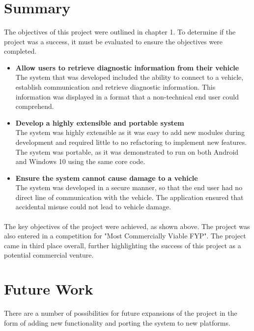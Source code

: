 \section{Summary}
	\paragraph{}{
	The objectives of this project were outlined in chapter 1. To determine if the project was a success, it must be evaluated to ensure the objectives were completed. 
		\begin{itemize}
			\item \textbf{Allow users to retrieve diagnostic information from their vehicle}\\
			The system that was developed included the ability to connect to a vehicle, establish communication and retrieve diagnostic information. This information was displayed in a format that a non-technical end user could comprehend.
			
			\item \textbf{Develop a highly extensible and portable system}\\
			The system was highly extensible as it was easy to add new modules during development and required little to no refactoring to implement new features. The system was portable, as it was demonstrated to run on both Android and Windows 10 using the same core code. 

			\item \textbf{Ensure the system cannot cause damage to a vehicle}\\
			The system was developed in a secure manner, so that the end user had no direct line of communication with the vehicle. The application ensured that accidental misuse could not lead to vehicle damage. 
		\end{itemize}
	}
	\paragraph{}{
	The key objectives of the project were achieved, as shown above. The project was also entered in a competition for "Most Commercially Viable FYP". The project came in third place overall, further highlighting the success of this project as a potential commercial venture.
	}
\section{Future Work}
	\paragraph{}{
	There are a number of possibilities for future expansions of the project in the form of adding new functionality and porting the system to new platforms.
	}
			
